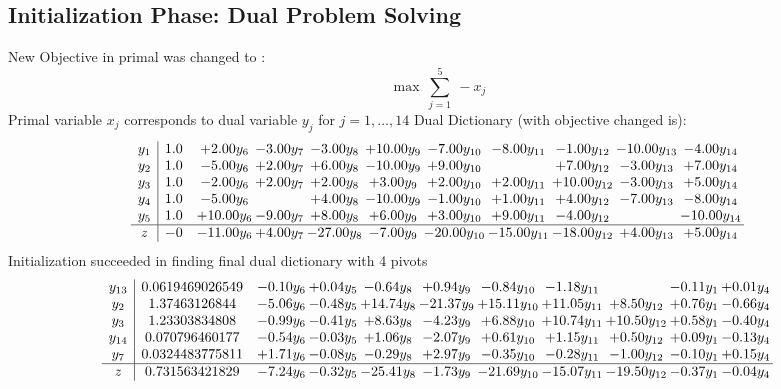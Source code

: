\documentclass[9pt]{article}
\begin{document}
\subsection{Initialization Phase: Dual Problem Solving}
New Objective in primal was changed to : \[ \max\ \sum_{j=1}^{5}\ - x_j \] 
Primal variable $x_j$ corresponds to dual variable $y_j$ for $j = 1,\ldots,14$
Dual Dictionary (with objective changed is): 
\[\begin{array}{c| c c@{\hskip 2pt} c@{\hskip 2pt} c@{\hskip 2pt} c@{\hskip 2pt} c@{\hskip 2pt} c@{\hskip 2pt} c@{\hskip 2pt} c@{\hskip 2pt} c@{\hskip 2pt} }
 y_{1}   &  1.0 & +  2.00 y_{6} & -3.00 y_{7} & -3.00 y_{8} & + 10.00 y_{9} & -7.00 y_{10} & -8.00 y_{11} & -1.00 y_{12} & -10.00 y_{13} & -4.00 y_{14}\\
 y_{2}   &  1.0 & -5.00 y_{6} & +  2.00 y_{7} & +  6.00 y_{8} & -10.00 y_{9} & +  9.00 y_{10} &   & +  7.00 y_{12} & -3.00 y_{13} & +  7.00 y_{14}\\
 y_{3}   &  1.0 & -2.00 y_{6} & +  2.00 y_{7} & +  2.00 y_{8} & +  3.00 y_{9} & +  2.00 y_{10} & +  2.00 y_{11} & + 10.00 y_{12} & -3.00 y_{13} & +  5.00 y_{14}\\
 y_{4}   &  1.0 & -5.00 y_{6} &   & +  4.00 y_{8} & -10.00 y_{9} & -1.00 y_{10} & +  1.00 y_{11} & +  4.00 y_{12} & -7.00 y_{13} & -8.00 y_{14}\\
 y_{5}   &  1.0 & + 10.00 y_{6} & -9.00 y_{7} & +  8.00 y_{8} & +  6.00 y_{9} & +  3.00 y_{10} & +  9.00 y_{11} & -4.00 y_{12} &   & -10.00 y_{14}\\
\hline
z    &  -0 & -11.00 y_{6} & +  4.00 y_{7} & -27.00 y_{8} & -7.00 y_{9} & -20.00 y_{10} & -15.00 y_{11} & -18.00 y_{12} & +  4.00 y_{13} & +  5.00 y_{14}\\
\end{array}\]
Initialization succeeded in finding final dual dictionary with 4 pivots
\[\begin{array}{c| c c@{\hskip 2pt} c@{\hskip 2pt} c@{\hskip 2pt} c@{\hskip 2pt} c@{\hskip 2pt} c@{\hskip 2pt} c@{\hskip 2pt} c@{\hskip 2pt} c@{\hskip 2pt} }
 y_{13}   &  0.0619469026549 & -0.10 y_{6} & +  0.04 y_{5} & -0.64 y_{8} & +  0.94 y_{9} & -0.84 y_{10} & -1.18 y_{11} &   & -0.11 y_{1} & +  0.01 y_{4}\\
 y_{2}   &  1.37463126844 & -5.06 y_{6} & -0.48 y_{5} & + 14.74 y_{8} & -21.37 y_{9} & + 15.11 y_{10} & + 11.05 y_{11} & +  8.50 y_{12} & +  0.76 y_{1} & -0.66 y_{4}\\
 y_{3}   &  1.23303834808 & -0.99 y_{6} & -0.41 y_{5} & +  8.63 y_{8} & -4.23 y_{9} & +  6.88 y_{10} & + 10.74 y_{11} & + 10.50 y_{12} & +  0.58 y_{1} & -0.40 y_{4}\\
 y_{14}   &  0.070796460177 & -0.54 y_{6} & -0.03 y_{5} & +  1.06 y_{8} & -2.07 y_{9} & +  0.61 y_{10} & +  1.15 y_{11} & +  0.50 y_{12} & +  0.09 y_{1} & -0.13 y_{4}\\
 y_{7}   &  0.0324483775811 & +  1.71 y_{6} & -0.08 y_{5} & -0.29 y_{8} & +  2.97 y_{9} & -0.35 y_{10} & -0.28 y_{11} & -1.00 y_{12} & -0.10 y_{1} & +  0.15 y_{4}\\
\hline
z    &  0.731563421829 & -7.24 y_{6} & -0.32 y_{5} & -25.41 y_{8} & -1.73 y_{9} & -21.69 y_{10} & -15.07 y_{11} & -19.50 y_{12} & -0.37 y_{1} & -0.04 y_{4}\\
\end{array}\]
\end{document}
